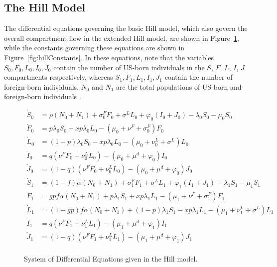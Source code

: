 \documentclass{amsart}
\renewcommand{\(}{\left(}
\renewcommand{\)}{\right)}
\begin{document}
\subsection{The Hill Model}
\label{appendix:hillEqs}
The differential equations governing the basic Hill model, which also govern the overall compartment flow
in the extended Hill model, are shown in Figure~\ref{fig:hillEquations}, while
the constants governing these equations are shown in
Figure~\ref{fig:hillConstants}. In these equations, note that the variables
$S_0, F_0, L_0, I_0, J_0$ contain the number of US-born individuals in the $S$,
$F$, $L$, $I$, $J$ compartments respectively, whereas $S_1, F_1, L_1, I_1, J_1$
contain the number of foreign-born individuals. $N_0$ and $N_1$ are the total
populations of US-born and foreign-born individuals \cite{hill_modelling_2012}.
\begin{figure}[h]
  \begin{align*}
    \dot{S}_0 &= \rho(N_0+N_1) + \sigma_0^FF_0 + \sigma^LL_0 
                +\varphi_0(I_0+J_0) - \lambda_0 S_0 - \mu_0 S_0\\
    \dot{F}_0 &= p\lambda_0S_0 + xp\lambda_0L_0 - (\mu_0+\nu^F+\sigma_0^F)F_0\\
    \dot{L}_0 &= (1-p)\lambda_0S_0 - xp\lambda_0L_0 
                -(\mu_0+\nu_0^L+\sigma^L)L_0\\
    \dot{I}_0 &= q(\nu^FF_0 + \nu_0^LL_0) - (\mu_0+\mu^d+\varphi_0)I_0\\
    \dot{J}_0 &= (1-q)(\nu^FF_0 + \nu_0^LL_0) - (\mu_0+\mu^d+\varphi_0)J_0\\
    \dot{S}_1 &= (1-f)\alpha(N_0+N_1) + \sigma_1^FF_1 + \sigma^LL_1 
                +\varphi_1(I_1+J_1) - \lambda_1S_1 - \mu_1S_1\\
    \dot{F}_1 &= gpf\alpha(N_0+N_1) + p\lambda_1S_1 + xp\lambda_1L_1 
                -(\mu_1+\nu^F+\sigma_1^F)F_1\\
    \dot{L}_1 &= (1-gp)f\alpha(N_0+N_1) + (1-p)\lambda_1S_1 - xp\lambda_1L_1 
                -(\mu_1+\nu_1^L+\sigma^L)L_1\\
    \dot{I}_1 &= q(\nu^FF_1 + \nu_1^LL_1) - (\mu_1+\mu^d+\varphi_1)I_1\\
    \dot{J}_1 &= (1-q)(\nu^FF_1 + \nu_1^LL_1) - (\mu_1+\mu^d+\varphi_1)J_1\\
  \end{align*}
  \caption{System of Differential Equations given in the Hill model.}
  \label{fig:hillEquations}
\end{figure}
\end{document}
